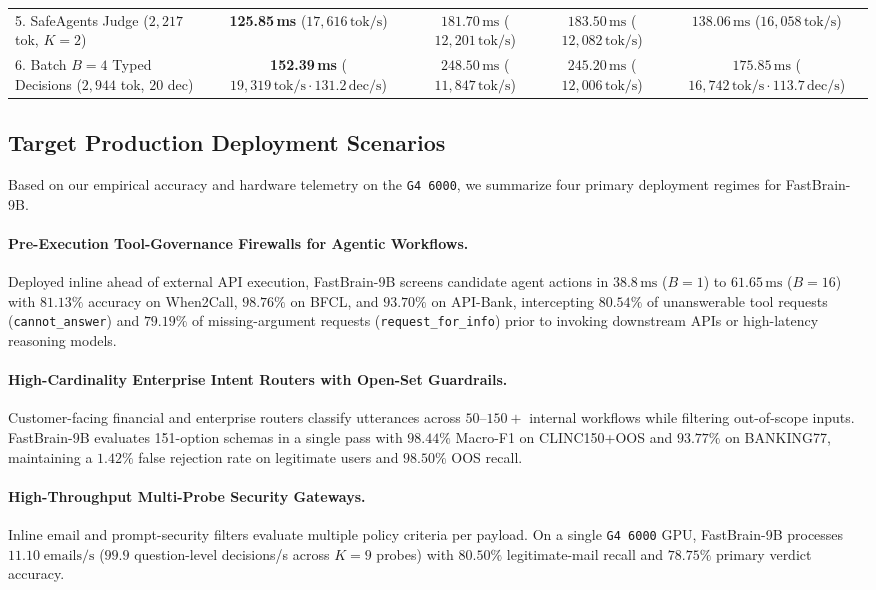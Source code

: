 \documentclass[10pt,twocolumn]{article}
\begin{document}
\begin{table}[t]
{\begin{tabular}{lcccc}
5. SafeAgents Judge ($2{,}217$ tok, $K=2$) & \textbf{125.85\,ms} ($17{,}616\,\text{tok/s}$) & $181.70\,\text{ms}$ ($12{,}201\,\text{tok/s}$) & $183.50\,\text{ms}$ ($12{,}082\,\text{tok/s}$) & $138.06\,\text{ms}$ ($16{,}058\,\text{tok/s}$) \\
6. Batch $B=4$ Typed Decisions ($2{,}944$ tok, $20$ dec) & \textbf{152.39\,ms} ($19{,}319\,\text{tok/s} \cdot 131.2\,\text{dec/s}$) & $248.50\,\text{ms}$ ($11{,}847\,\text{tok/s}$) & $245.20\,\text{ms}$ ($12{,}006\,\text{tok/s}$) & $175.85\,\text{ms}$ ($16{,}742\,\text{tok/s} \cdot 113.7\,\text{dec/s}$) \\
\bottomrule
\end{tabular}%
}
\end{table}

\subsection{Target Production Deployment Scenarios}
Based on our empirical accuracy and hardware telemetry on the \texttt{G4 6000}, we summarize four primary deployment regimes for FastBrain-9B.

\paragraph{Pre-Execution Tool-Governance Firewalls for Agentic Workflows.}
Deployed inline ahead of external API execution, FastBrain-9B screens candidate agent actions in $38.8\,\text{ms}$ ($B=1$) to $61.65\,\text{ms}$ ($B=16$) with $81.13\%$ accuracy on When2Call, $98.76\%$ on BFCL, and $93.70\%$ on API-Bank, intercepting $80.54\%$ of unanswerable tool requests (\texttt{cannot\_answer}) and $79.19\%$ of missing-argument requests (\texttt{request\_for\_info}) prior to invoking downstream APIs or high-latency reasoning models.

\paragraph{High-Cardinality Enterprise Intent Routers with Open-Set Guardrails.}
Customer-facing financial and enterprise routers classify utterances across $50\text{--}150+$ internal workflows while filtering out-of-scope inputs. FastBrain-9B evaluates 151-option schemas in a single pass with $98.44\%$ Macro-F1 on CLINC150+OOS and $93.77\%$ on BANKING77, maintaining a $1.42\%$ false rejection rate on legitimate users and $98.50\%$ OOS recall.

\paragraph{High-Throughput Multi-Probe Security Gateways.}
Inline email and prompt-security filters evaluate multiple policy criteria per payload. On a single \texttt{G4 6000} GPU, FastBrain-9B processes $11.10\;\text{emails/s}$ ($99.9$ question-level decisions/s across $K=9$ probes) with $80.50\%$ legitimate-mail recall and $78.75\%$ primary verdict accuracy.
\end{document}
